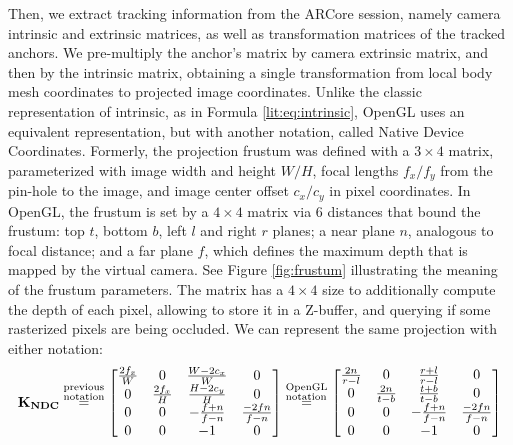 Then, we extract tracking information from the ARCore session, namely camera intrinsic and extrinsic matrices, as well as transformation matrices of the tracked anchors. We pre-multiply the anchor's matrix by camera extrinsic matrix, and then by the intrinsic matrix, obtaining a single transformation from local body mesh coordinates to projected image coordinates. Unlike the classic representation of intrinsic, as in Formula \ref{lit:eq:intrinsic}, OpenGL uses an equivalent representation, but with another notation, called Native Device Coordinates. Formerly, the projection frustum was defined with a $3 \times 4$ matrix, parameterized with image width and height $W/H$, focal lengths $f_x/f_y$ from the pin-hole to the image, and image center offset $c_x/c_y$ in pixel coordinates. In OpenGL, the frustum is set by a $4 \times 4$ matrix via 6 distances that bound the frustum: top $t$, bottom $b$, left $l$ and right $r$ planes; a near plane $n$, analogous to focal distance; and a far plane $f$, which defines the maximum depth that is mapped by the virtual camera. See Figure \ref{fig:frustum} illustrating the meaning of the frustum parameters. The matrix has a $4 \times 4$ size to additionally compute the depth of each pixel, allowing to store it in a Z-buffer, and querying if some rasterized pixels are being occluded.  We can represent the same projection with either notation:
\begin{equation}
	\bm{\mathrm{K_{NDC}}} \overset{\begin{subarray}{l}\text{previous} \\ \text{notation}\end{subarray}}{=} 
	\begin{bmatrix} 
		\tfrac{2f_x}{W} & 0                & \tfrac{W - 2c_x}{W}  & 0 \\ 
		0               & \tfrac{2f_x}{H}  & \tfrac{H - 2c_y}{H}  & 0 \\
		0               & 0                & -\tfrac{f + n}{f - n} & \tfrac{-2fn}{f - n} \\
		0               & 0                & -1                   & 0
	\end{bmatrix} \overset{\begin{subarray}{l}\text{OpenGL} \\ \text{notation}\end{subarray}}{=} 
	\begin{bmatrix} 
		\tfrac{2n}{r - l} & 0              & \tfrac{r + l}{r - l} & 0 \\
		0               & \tfrac{2n}{t - b}  & \tfrac{t + b}{t - b} & 0 \\
		0               & 0                & -\tfrac{f + n}{f - n} & \tfrac{-2fn}{f - n} \\
		0               & 0                & -1                   & 0
	\end{bmatrix}
	\label{methods:eq:ndc-projection}
\end{equation}

